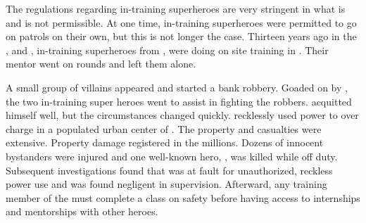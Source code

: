 \documentclass[blue]{LRSguildcamp1}
\begin{document}
\name{\bChicagoIncident{}}

The regulations regarding in-training superheroes are very stringent in what is and is not permissible. At one time, in-training superheroes were permitted to go on patrols on their own, but this is not longer the case. Thirteen years ago in the \pCityO{}, \cYSOldName{} and \cJuggernaut{}, in-training superheroes from \pSuperSchool{}, were doing on site training in \pCityO{}. Their mentor \cOS{\MYsupername} went on rounds and left them alone. 

A small group of villains appeared and started a bank robbery. Goaded on by \cYSOldName{}, the two in-training super heroes went to assist in fighting the robbers. \cJuggernaut{} acquitted himself well, but the circumstances changed quickly. \cYSOldName{} recklessly used \cYS{\their} power to over charge \cJuggernaut{} in a populated urban center of \pCityO{}. The property and casualties were extensive. Property damage registered in the millions. Dozens of innocent bystanders were injured and one well-known hero, \cAS{\MYsupername}, was killed while off duty. Subsequent investigations found that \cYSOldName{} was at fault for unauthorized, reckless power use and \cOS{\MYsupername} was found negligent in supervision. Afterward, any training member of the \cHeroLeague{\intro} must complete a class on safety before having access to internships and mentorships with other heroes. 


\end{document}

